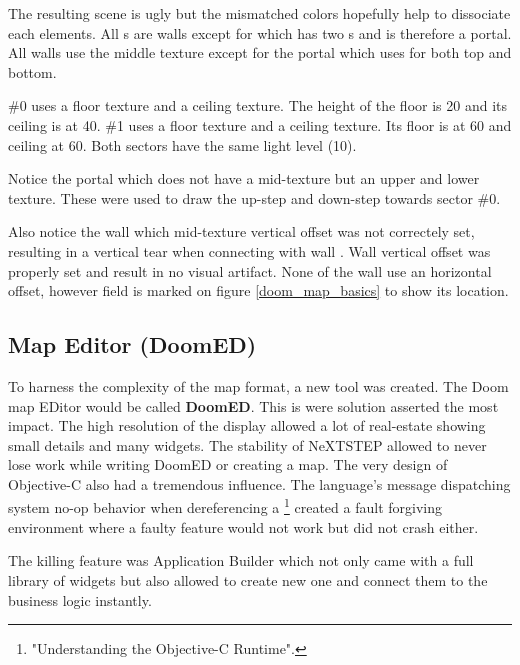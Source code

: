 \par
The resulting scene is ugly but the mismatched colors hopefully help to dissociate each elements. All s are walls except for  which has two s and is therefore a portal. All walls use the  middle texture except for the portal which uses  for both top and bottom.\\
\par
{} \#0 uses a  floor texture and a  ceiling texture. The height of the floor is 20 and its ceiling is at 40.  \#1 uses a  floor texture and a  ceiling texture. Its floor is at 60 and ceiling at 60. Both sectors have the same light level (10).\\
\par
   Notice the portal  which does not have a mid-texture but an upper and lower texture. These were used to draw the up-step and down-step towards sector \#0.\\
\par
Also notice the wall  which mid-texture vertical offset was not correctely set, resulting in a vertical tear when connecting with wall . Wall  vertical offset was properly set and result in no visual artifact. None of the wall use an horizontal offset, however field is marked  on figure \ref{doom_map_basics} to show its location.\\ 
\pagebreak



\subsection{Map Editor (DoomED)}
To harness the complexity of the map format, a new tool was created. The Doom map EDitor would be called \textbf{DoomED}. This is were \NeXT solution asserted the most impact. The high resolution of the display allowed a lot of real-estate showing small details and many widgets. The stability of NeXTSTEP allowed to never lose work while writing DoomED or creating a map.
The very design of Objective-C also had a tremendous influence. The language's message dispatching system no-op behavior when dereferencing a \footnote{"Understanding the Objective-C Runtime".} created a fault forgiving environment where a faulty feature would not work but did not crash either.\\
\par   
The killing feature was Application Builder which not only came with a full library of widgets but also allowed to create new one and connect them to the business logic instantly.\\
\par
{}
\par

